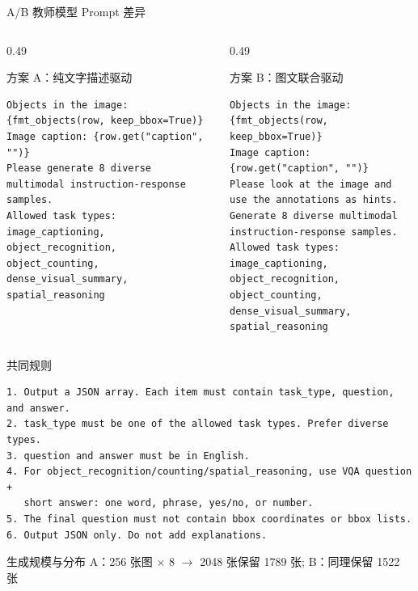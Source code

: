 \documentclass{beamer}
\begin{document}
\begin{frame}[fragile,shrink=4]{A/B 教师模型 Prompt 差异}
\small
\centering
\begin{minipage}{0.96\textwidth}
\begin{columns}[T,onlytextwidth,totalwidth=\linewidth]
\begin{column}{0.49\linewidth}
\vspace{0pt}
\centering
\begin{block}{方案 A：纯文字描述驱动}
\tiny
\begin{verbatim}
Objects in the image:
{fmt_objects(row, keep_bbox=True)}
Image caption: {row.get("caption", "")}
Please generate 8 diverse multimodal instruction-response samples.
Allowed task types:
image_captioning, object_recognition,
object_counting, dense_visual_summary, spatial_reasoning
\end{verbatim}
\end{block}
\end{column}
\begin{column}{0.49\linewidth}
\vspace{0pt}
\centering
\begin{block}{方案 B：图文联合驱动}
\tiny
\begin{verbatim}
Objects in the image:
{fmt_objects(row, keep_bbox=True)}
Image caption: {row.get("caption", "")}
Please look at the image and use the annotations as hints.
Generate 8 diverse multimodal instruction-response samples.
Allowed task types:
image_captioning, object_recognition,
object_counting, dense_visual_summary, spatial_reasoning
\end{verbatim}
\end{block}
\end{column}
\end{columns}
\vspace{-0.5em}
\begin{block}{共同规则}
\tiny
\begin{verbatim}
1. Output a JSON array. Each item must contain task_type, question, and answer.
2. task_type must be one of the allowed task types. Prefer diverse types.
3. question and answer must be in English.
4. For object_recognition/counting/spatial_reasoning, use VQA question +
   short answer: one word, phrase, yes/no, or number.
5. The final question must not contain bbox coordinates or bbox lists.
6. Output JSON only. Do not add explanations.
\end{verbatim}
\end{block}
\vspace{-0.5em}
\begin{block}{生成规模与分布}
\scriptsize
A：256 张图 $\times$ 8 $\rightarrow$ 2048 张保留 1789 张; B：同理保留 1522 张
\end{block}
\end{minipage}
\end{frame}
\end{document}
